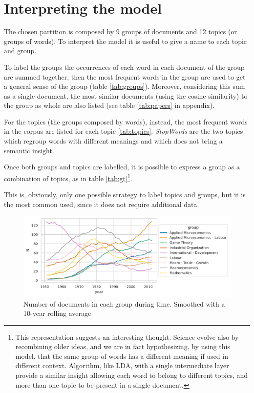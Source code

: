 \documentclass[a4paper, 11pt, headings=standardclasses, tablecaptionsbelow]{scrartcl}
\begin{document}
\section{Interpreting the model}
The chosen partition is composed by 9 groups of documents and 12 topics (or groups of words).
To interpret the model it is useful to give a name to each topic and group.



To label the groups the occurrences of each word in each document of the group are summed together, then the most frequent words in the group are used to get a general sense of the group (table \ref{tab:groups}). Moreover, considering this sum as a single document, the most similar documents (using the cosine similarity) to the group as whole are also listed (see table \ref{tab:papers} in appendix).



For the topics (the groups composed by words), instead, the most frequent words in the corpus are listed for each topic \ref{tab:topics}. \textit{StopWords} are the two topics which regroup words with different meanings and which does not bring a semantic insight.



Once both groups and topics are labelled, it is possible to express a group as a combination of topics, as in table \ref{tab:gt}\footnote{This representation suggests an interesting thought. Science evolve also by recombining older ideas, and we are in fact hypothesizing, by using this model, that the same group of words has a different meaning if used in different context. Algorithm, like LDA, with a single intermediate layer provide a similar insight allowing each word to belong to different topics, and more than one topic to be present in a single document.}.

This is, obviously, only one possible strategy to label topics and groups, but it is the most common used, since it does not require additional data.

\begin{figure}[tb]
  \centering
  \includegraphics[width=\textwidth]{src/groups.pdf}
  \caption[Groups]{Number of documents in each group during time. Smoothed with a 10-year rolling average}
  \label{fig:groups}
\end{figure}
\end{document}
